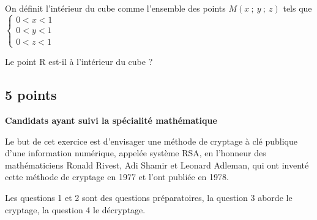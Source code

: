 \documentclass[10pt]{article}
\begin{document}
On définit l'intérieur du cube comme l'ensemble des points $M(x~;~y~;~z)$ tels que $\left\{\begin{array}{l}
0 < x < 1\\
0 < y < 1\\
0 < z < 1
\end{array}\right.$

Le point R est-il à l'intérieur du cube ?

\subsection{\hfill 5 points}
 
\textbf{Candidats ayant suivi la spécialité mathématique}

\medskip

Le but de cet exercice est d'envisager une méthode de cryptage à clé publique d'une information
numérique, appelée système RSA, en l'honneur des mathématiciens Ronald Rivest, Adi Shamir et
Leonard Adleman, qui ont inventé cette méthode de cryptage en 1977 et l'ont publiée en 1978.

\smallskip

Les questions 1 et 2 sont des questions préparatoires, la question 3 aborde le cryptage, la question 4
le décryptage.

\bigskip
\end{document}
